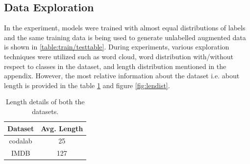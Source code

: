 \documentclass[%
	BCOR=8mm, %
	DIV=12,
	toc=bibliography, %
	toc=listof, %
	oneside, %
	egregdoesnotlikesansseriftitles, %
	]{scrbook}
\begin{document}
\subsection{Data Exploration}
\label{subsection:dataexploration}
In the experiment, models were trained with almost equal distributions of labels and the same training data is being used to generate unlabelled augmented data is shown in \ref{table:train/testtable}. During experiments, various exploration techniques were utilized such as word cloud, word distribution with/without respect to classes in the dataset, and length distribution mentioned in the appendix. However, the most relative information about the dataset i.e. about length is provided in the table \ref{table:Length stat } and figure \ref{fig:lendist}.
\begin{table}[!h]
\centering
\begin{tabular}{ |c|c| }
\hline
Dataset &  Avg. Length  \\
\hline
codalab & 25  \\
IMDB & 127  \\
\hline
\end{tabular}
\caption[Length details of datasets]{Length details of both the datasets.}
\label{table:Length stat }
\end{table}
\end{document}
